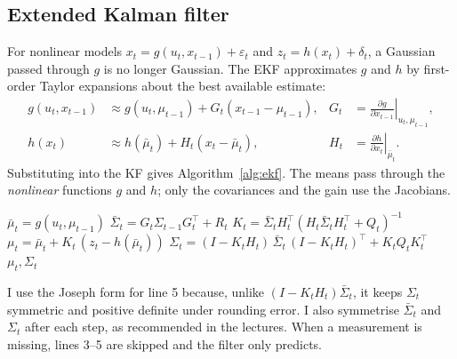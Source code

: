\documentclass[11pt]{article}
\begin{document}
\subsection{Extended Kalman filter}
For nonlinear models $x_t=g(u_t,x_{t-1})+\varepsilon_t$ and $z_t=h(x_t)+\delta_t$, a Gaussian passed through $g$ is no longer Gaussian. The EKF approximates $g$ and $h$ by first-order Taylor expansions about the best available estimate:
\begin{align}
g(u_t,x_{t-1})&\approx g(u_t,\mu_{t-1})+G_t(x_{t-1}-\mu_{t-1}), & G_t&=\left.\frac{\partial g}{\partial x_{t-1}}\right|_{u_t,\mu_{t-1}},\\
h(x_t)&\approx h(\bar\mu_t)+H_t(x_t-\bar\mu_t), & H_t&=\left.\frac{\partial h}{\partial x_t}\right|_{\bar\mu_t}.
\end{align}
Substituting into the KF gives Algorithm~\ref{alg:ekf}. The means pass through the \emph{nonlinear} functions $g$ and $h$; only the covariances and the gain use the Jacobians.

\begin{algorithm}[h]
\caption{Extended\_Kalman\_filter$(\mu_{t-1},\Sigma_{t-1},u_t,z_t)$ (as in the lecture notes)}\label{alg:ekf}
\begin{algorithmic}[1]
\State $\bar\mu_t = g(u_t,\mu_{t-1})$ 
\State $\bar\Sigma_t = G_t\Sigma_{t-1}G_t^\top + R_t$
\State $K_t = \bar\Sigma_t H_t^\top (H_t\bar\Sigma_t H_t^\top + Q_t)^{-1}$ 
\State $\mu_t = \bar\mu_t + K_t\,(z_t - h(\bar\mu_t))$ 
\State $\Sigma_t = (I-K_tH_t)\,\bar\Sigma_t\,(I-K_tH_t)^\top + K_tQ_tK_t^\top$ 
\State \Return $\mu_t,\Sigma_t$
\end{algorithmic}
\end{algorithm}

I use the Joseph form for line 5 because, unlike $(I-K_tH_t)\bar\Sigma_t$, it keeps $\Sigma_t$ symmetric and positive definite under rounding error. I also symmetrise $\bar\Sigma_t$ and $\Sigma_t$ after each step, as recommended in the lectures. When a measurement is missing, lines 3--5 are skipped and the filter only predicts.
\end{document}
